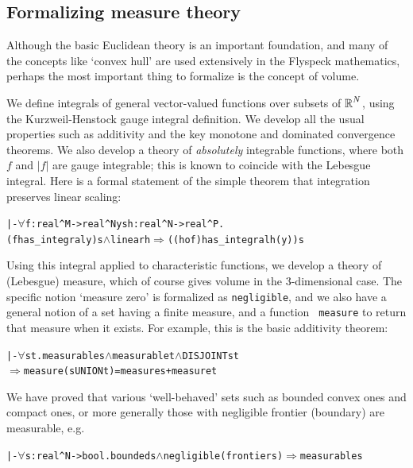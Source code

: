 \documentclass[11pt]{amsart}
\def\sz{small} %
\newcommand{\real}{\mbox{$\protect\mathbb R$}}
\let\And=\wedge                    %
\newcommand{\Imp}{\Rightarrow}
\begin{document}
\subsection{Formalizing measure theory}

Although the basic Euclidean theory is an important foundation, and many of the
concepts like `convex hull' are used extensively in the Flyspeck mathematics,
perhaps the most important thing to formalize is the concept of volume.

We define integrals of general vector-valued functions over subsets of
$\real^N$, using the Kurzweil-Henstock gauge integral definition. We develop
all the usual properties such as additivity and the key monotone and dominated
convergence theorems. We also develop a theory of {\em absolutely} integrable
functions, where both $f$ and $|f|$ are gauge integrable; this is known to
coincide with the Lebesgue integral. Here is a formal statement of the simple
theorem that integration preserves linear scaling:

\begin{\sz}
\begin{alltt}
|- \(\forall\)f:real^M->real^N y s h:real^N->real^P.
        (f has_integral y) s \(\And\) linear h \(\Imp\) ((h o f) has_integral h(y)) s
\end{alltt}
\end{\sz}

Using this integral applied to characteristic functions, we develop a theory of
(Lebesgue) measure, which of course gives volume in the 3-dimensional case. The
specific notion `measure zero' is formalized as {\tt negligible}, and we also
have a general notion of a set having a finite measure, and a function {\tt
measure} to return that measure when it exists. For example, this is the basic
additivity theorem:

\begin{\sz}
\begin{alltt}
|- \(\forall\)s t. measurable s \(\And\) measurable t \(\And\) DISJOINT s t
         \(\Imp\) measure(s UNION t) = measure s + measure t
\end{alltt}
\end{\sz}

We have proved that various `well-behaved' sets such as bounded convex ones and
compact ones, or more generally those with negligible frontier (boundary) are
measurable, e.g.

\begin{\sz}
\begin{alltt}
|- \(\forall\)s:real^N->bool. bounded s \(\And\) negligible(frontier s) \(\Imp\) measurable s
\end{alltt}
\end{\sz}
\end{document}
